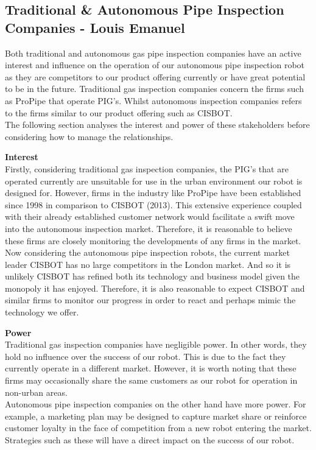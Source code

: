 \documentclass[11pt]{article}		%
\begin{document}
		\subsection[Traditional  \& Autonomous Pipe Inspection Companies]{Traditional \& Autonomous Pipe Inspection Companies - Louis Emanuel}
            Both traditional and autonomous gas pipe inspection companies have an active interest and influence on the operation of our autonomous pipe inspection robot as they are competitors to our product offering currently or have great potential to be in the future. Traditional gas inspection companies concern the firms such as ProPipe that operate PIG’s. Whilst autonomous inspection companies refers to the firms similar to our product offering such as CISBOT. \\
            \hspace*{3ex}The following section analyses the interest and power of these stakeholders before considering how to manage the relationships.
            
            \textbf{Interest}\\
            Firstly, considering traditional gas inspection companies, the PIG’s that are operated currently are unsuitable for use in the urban environment our robot is designed for. However, firms in the industry like ProPipe have been established since 1998 in comparison to CISBOT (2013). This extensive experience coupled with their already established customer network would facilitate a swift move into the autonomous inspection market. Therefore, it is reasonable to believe these firms are closely monitoring the developments of any firms in the market. \\
            \hspace*{3ex}Now considering the autonomous pipe inspection robots, the current market leader CISBOT has no large competitors in the London market. And so it is unlikely CISBOT has refined both its technology and business model given the monopoly it has enjoyed. Therefore, it is also reasonable to expect CISBOT and similar firms to monitor our progress in order to react and perhaps mimic the technology we offer. 
            
            \textbf{Power}\\
            Traditional gas inspection companies have negligible power. In other words, they hold no influence over the success of our robot. This is due to the fact they currently operate in a different market. However, it is worth noting that these firms may occasionally share the same customers as our robot for operation in non-urban areas. \\
            \hspace*{3ex}Autonomous pipe inspection companies on the other hand have more power. For example, a marketing plan may be designed to capture market share or reinforce customer loyalty in the face of competition from a new robot entering the market. Strategies such as these will have a direct impact on the success of our robot. 
            
\end{document}
